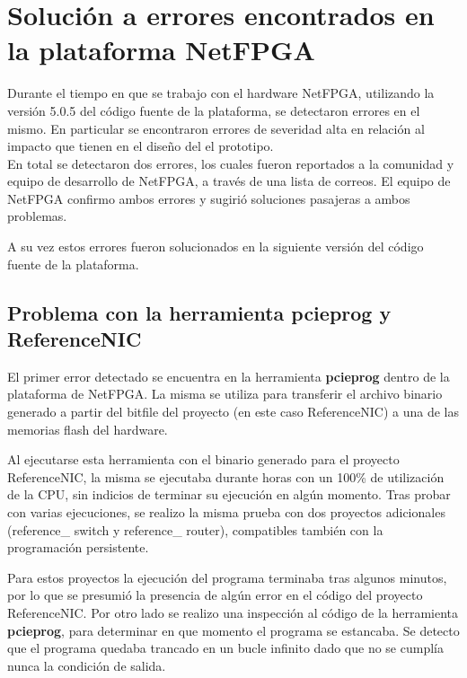 \chapter{Soluci\'on a errores encontrados en la plataforma NetFPGA} 
\label{apendiceA}

Durante el tiempo en que se trabajo con el hardware NetFPGA, utilizando la versi\'on 5.0.5 del c\'odigo fuente de la plataforma, se detectaron errores en el mismo. En particular se encontraron errores de severidad alta en relaci\'on al impacto que tienen en el diseño del el prototipo.\\

En total se detectaron dos errores, los cuales fueron reportados a la comunidad y equipo de desarrollo de NetFPGA, a través de una lista de correos\citep{NetFPGABetaMailing}. El equipo de NetFPGA confirmo ambos errores y sugirió soluciones pasajeras a ambos problemas.

A su vez estos errores fueron solucionados en la siguiente versi\'on del c\'odigo fuente de la plataforma.
 
\section{Problema con la herramienta pcieprog y ReferenceNIC}
El primer error detectado se encuentra en la herramienta \textbf{pcieprog} dentro de la plataforma de NetFPGA. La misma se utiliza para transferir el archivo binario generado a partir del bitfile del proyecto (en este caso ReferenceNIC) a una de las memorias flash del hardware.

Al ejecutarse esta herramienta con el binario generado para el proyecto ReferenceNIC, la misma se ejecutaba durante horas con un 100\% de utilizaci\'on de la CPU, sin indicios de terminar su ejecución en algún momento. Tras probar con varias ejecuciones, se realizo la misma prueba con dos proyectos adicionales (reference\_ switch y reference\_ router), compatibles también con la programaci\'on persistente. 

Para estos proyectos la ejecución del programa terminaba tras algunos minutos, por lo que se presumi\'o la presencia de algún error en el c\'odigo del proyecto ReferenceNIC. Por otro lado se realizo una inspecci\'on al c\'odigo de la herramienta \textbf{pcieprog}, para determinar en que momento el programa se estancaba. Se detecto que el programa quedaba trancado en un bucle infinito dado que no se cumplía nunca la condici\'on de salida.\\ 

